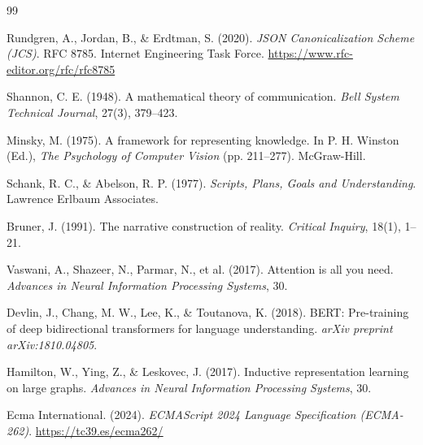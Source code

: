\documentclass[11pt,a4paper]{article}
\begin{document}
\begin{thebibliography}{99}

Rundgren, A., Jordan, B., \& Erdtman, S. (2020).
\textit{JSON Canonicalization Scheme (JCS)}.
RFC 8785. Internet Engineering Task Force.
\url{https://www.rfc-editor.org/rfc/rfc8785}

Shannon, C. E. (1948).
A mathematical theory of communication.
\textit{Bell System Technical Journal}, 27(3), 379--423.

Minsky, M. (1975).
A framework for representing knowledge.
In P. H. Winston (Ed.), \textit{The Psychology of Computer Vision} (pp. 211--277). McGraw-Hill.

Schank, R. C., \& Abelson, R. P. (1977).
\textit{Scripts, Plans, Goals and Understanding}.
Lawrence Erlbaum Associates.

Bruner, J. (1991).
The narrative construction of reality.
\textit{Critical Inquiry}, 18(1), 1--21.

Vaswani, A., Shazeer, N., Parmar, N., et al. (2017).
Attention is all you need.
\textit{Advances in Neural Information Processing Systems}, 30.

Devlin, J., Chang, M. W., Lee, K., \& Toutanova, K. (2018).
BERT: Pre-training of deep bidirectional transformers for language understanding.
\textit{arXiv preprint arXiv:1810.04805}.

Hamilton, W., Ying, Z., \& Leskovec, J. (2017).
Inductive representation learning on large graphs.
\textit{Advances in Neural Information Processing Systems}, 30.

Ecma International. (2024).
\textit{ECMAScript 2024 Language Specification (ECMA-262)}.
\url{https://tc39.es/ecma262/}

\end{thebibliography}
\end{document}
